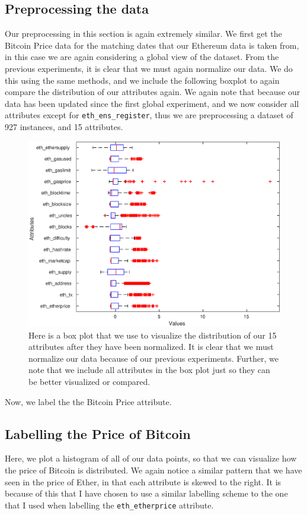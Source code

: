 \documentclass{article}
\begin{document}
\subsection{Preprocessing the data}
Our preprocessing in this section is again extremely similar. We first get the Bitcoin Price data for the matching dates that our Ethereum data is taken from, in this case we are again considering a global view of the dataset. From the previous experiments, it is clear that we must again normalize our data. We do this using the same methods, and we include the following boxplot to again compare the distribution of our attributes again. We again note that because our data has been updated since the first global experiment, and we now consider all attributes except for \texttt{eth\_ens\_register}, thus we  are preprocessing a dataset of 927 instances, and 15 attributes.

\begin{figure}[H]
\centering
\caption{Here is a box plot that we use to visualize the distribution of our 15 attributes after they have been normalized. It is clear that we must normalize our data because of our previous experiments. Further, we note that we include all attributes in the box plot just so they can be better visualized or compared.}
\includegraphics{final/boxplot_after_norm_btc.eps}
\end{figure}

Now, we label the the Bitcoin Price attribute.

\subsection{Labelling the Price of Bitcoin}
Here, we plot a histogram of all of our data points, so that we can visualize how the price of Bitcoin is distributed. We again notice a similar pattern that we have seen in the price of Ether, in that each attribute is skewed to the right. It is because of this that I have chosen to use a similar labelling scheme to the one that I used when labelling the \texttt{eth\_etherprice} attribute.
\end{document}
